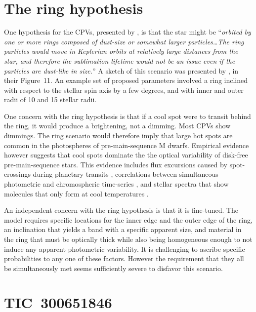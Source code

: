 \documentclass[11pt,twocolumn,tighten]{aastex63}
\begin{document}

\appendix

\section{The ring hypothesis}
\label{app:ring}

One hypothesis for the CPVs, presented by \citet{2019ApJ...876..127Z},
is that the star might be ``{\it orbited by one or more rings composed
of dust-size or somewhat larger particles\ldots The ring particles
would move in Keplerian orbits at relatively large distances from the
star, and therefore the sublimation lifetime would not be an issue
even if the particles are dust-like in size.}'' A sketch of this
scenario was presented by \citet{2019ApJ...876..127Z}, in their
Figure~11.  An example set of proposed parameters involved a ring
inclined with respect to the stellar spin axis by a few degrees, and
with inner and outer radii of 10 and 15 stellar radii.

One concern with the ring hypothesis is that if a cool spot were to
transit behind the ring, it would produce a brightening, not a
dimming.   Most CPVs show dimmings.   The ring scenario would therefore
imply that large hot spots are common in the photospheres of
pre-main-sequence M dwarfs.  Empirical evidence however suggests that
cool spots dominate the the optical variability of disk-free
pre-main-sequence stars.  This evidence includes flux excursions
caused by spot-crossings during planetary transits
\citep[e.g.][]{2020AJ....160...33R,2022AJ....163..147G}, correlations
between simultaneous photometric and chromospheric time-series
\citep{2019A&A...621A..21R}, and stellar spectra that show molecules
that only form at cool temperatures
\citep[e.g.][]{2017ApJ...836..200G,2023ApJ...946...10P}.

An independent  concern with the ring hypothesis is that it is
fine-tuned.  The model requires specific locations for the inner edge
and the outer edge of the ring, an inclination that yields a band with
a specific apparent size, and material in the ring that must be
optically thick while also being homogeneous enough to not induce any
apparent photometric variability.  It is challenging to ascribe
specific probabilities to any one of these factors.  However the
requirement that they all be simultaneously met seems sufficiently
severe to disfavor this scenario.



\section{TIC~300651846}
\label{app:tic3006}
\end{document}
